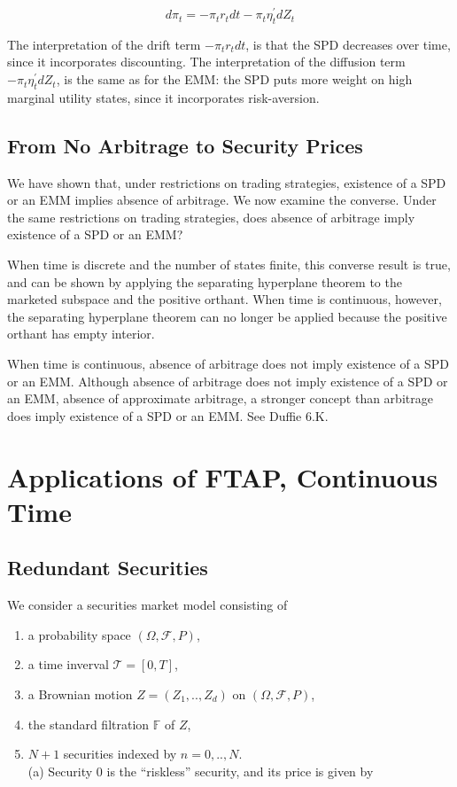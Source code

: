 \documentclass[\topdir/lecture\_notes.tex]{subfiles}
\begin{document}
\begin{equation*}
d \pi_{t}=-\pi_{t} r_{t} d t-\pi_{t} \eta_{t}^{\prime} d Z_{t}
\end{equation*}

The interpretation of the drift term $-\pi_{t} r_{t} d t$, is that the SPD decreases over time, since it incorporates discounting. The interpretation of the diffusion term $-\pi_{t} \eta_{t}^{\prime} d Z_{t}$, is the same as for the EMM: the SPD puts more weight on high marginal utility states, since it incorporates risk-aversion.


\subsection{From No Arbitrage to Security Prices}
We have shown that, under restrictions on trading strategies, existence of a SPD or an EMM implies absence of arbitrage. We now examine the converse. Under the same restrictions on trading strategies, does absence of arbitrage imply existence of a SPD or an EMM?

When time is discrete and the number of states finite, this converse result is true, and can be shown by applying the separating hyperplane theorem to the marketed subspace and the positive orthant. When time is continuous, however, the separating hyperplane theorem can no longer be applied because the positive orthant has empty interior.

When time is continuous, absence of arbitrage does not imply existence of a SPD or an EMM. Although absence of arbitrage does not imply existence of a SPD or an EMM, absence of approximate arbitrage, a stronger concept than arbitrage does imply existence of a SPD or an EMM. See Duffie 6.K.


\section{Applications of FTAP, Continuous Time}


\subsection{Redundant Securities}
We consider a securities market model consisting of

\begin{enumerate}
  \item a probability space $(\Omega, \mathcal{F}, P)$,

  \item a time inverval $\mathcal{T}=[0, T]$,

  \item a Brownian motion $Z=\left(Z_{1}, . ., Z_{d}\right)$ on $(\Omega, \mathcal{F}, P)$,

  \item the standard filtration $\mathbb{F}$ of $Z$,

  \item $N+1$ securities indexed by $n=0, . ., N$.\\
(a) Security 0 is the ``riskless'' security, and its price is given by

\end{enumerate}
\end{document}
